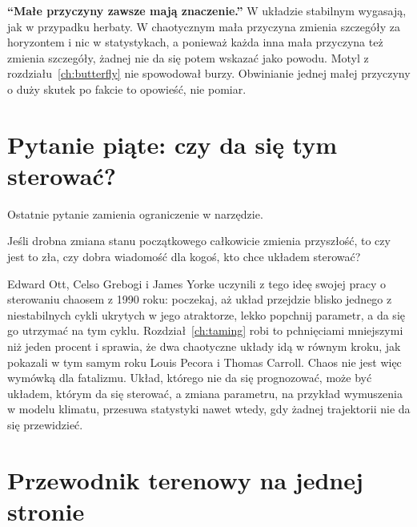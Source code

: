\begin{trapbox}
\textbf{\enquote{Małe przyczyny zawsze mają znaczenie.}} W układzie
stabilnym wygasają, jak w przypadku herbaty. W chaotycznym mała przyczyna
zmienia szczegóły za horyzontem i nic w statystykach, a ponieważ każda inna
mała przyczyna też zmienia szczegóły, żadnej nie da się potem wskazać jako
powodu. Motyl z rozdziału~\ref{ch:butterfly} nie spowodował burzy.
Obwinianie jednej małej przyczyny o duży skutek po fakcie to opowieść, nie
pomiar.
\end{trapbox}

\section{Pytanie piąte: czy da się tym sterować?}
\label{sec:ch18-steer}

\noindent
Ostatnie pytanie zamienia ograniczenie w narzędzie.

\begin{think}
Jeśli drobna zmiana stanu początkowego całkowicie zmienia przyszłość, to
czy jest to zła, czy dobra wiadomość dla kogoś, kto chce układem sterować?
\end{think}
Edward Ott, Celso Grebogi i James Yorke uczynili z tego ideę swojej pracy o
sterowaniu chaosem z 1990 roku: poczekaj, aż układ przejdzie blisko
jednego z niestabilnych cykli ukrytych w jego atraktorze, lekko popchnij
parametr, a da się go utrzymać na tym cyklu. Rozdział~\ref{ch:taming} robi
to pchnięciami mniejszymi niż jeden procent i sprawia, że dwa chaotyczne
układy idą w równym kroku, jak pokazali w tym samym roku Louis Pecora i
Thomas Carroll. Chaos nie jest więc wymówką dla fatalizmu. Układ, którego
nie da się prognozować, może być układem, którym da się sterować, a zmiana
parametru, na przykład wymuszenia w modelu klimatu, przesuwa statystyki
nawet wtedy, gdy żadnej trajektorii nie da się przewidzieć.


\section{Przewodnik terenowy na jednej stronie}
\label{sec:ch18-guide}

